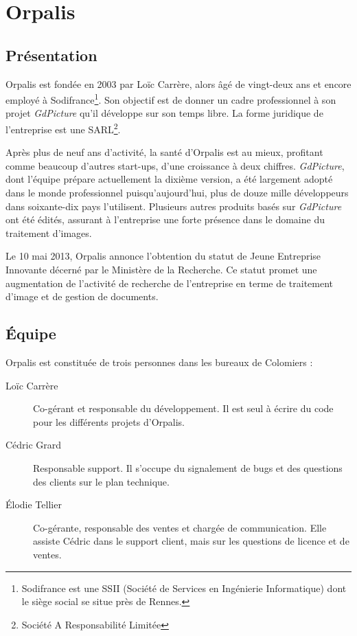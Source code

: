\chapter{Orpalis}

\section{Présentation}

Orpalis est fondée en 2003 par Loïc Carrère, alors âgé de vingt-deux ans et encore employé à Sodifrance\footnote{Sodifrance est une SSII (Société de Services en Ingénierie Informatique) dont le siège social se situe près de Rennes.}. Son objectif est de donner un cadre professionnel à son projet \emph{GdPicture} qu'il développe sur son temps libre. La forme juridique de l'entreprise est une SARL\footnote{Société A Responsabilité Limitée}. 

Après plus de neuf ans d'activité, la santé d'Orpalis est au mieux, profitant comme beaucoup d'autres start-ups, d'une croissance à deux chiffres. \emph{GdPicture}, dont l'équipe prépare actuellement la dixième version, a été largement adopté dans le monde professionnel puisqu'aujourd'hui, plus de douze mille développeurs dans soixante-dix pays l'utilisent. Plusieurs autres produits basés sur \emph{GdPicture} ont été édités, assurant à l'entreprise une forte présence dans le domaine du traitement d'images.

Le 10 mai 2013, Orpalis annonce l'obtention du statut de Jeune Entreprise Innovante décerné par le Ministère de la Recherche. Ce statut promet une augmentation de l'activité de recherche de l'entreprise en terme de traitement d'image et de gestion de documents.

\section{Équipe}

Orpalis est constituée de trois personnes dans les bureaux de Colomiers :

\begin{description}
\item[Loïc Carrère] Co-gérant et responsable du développement. Il est seul à écrire du code pour les différents projets d'Orpalis. 
\item[Cédric Grard] Responsable support. Il s'occupe du signalement de bugs et des questions des clients sur le plan technique.
\item[\'{E}lodie Tellier] Co-gérante, responsable des ventes et chargée de communication. Elle assiste Cédric dans le support client, mais sur les questions de licence et de ventes.
\end{description}


